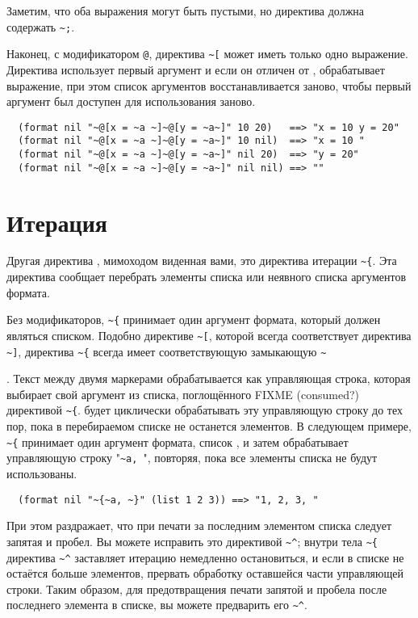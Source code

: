 {Заметим, что оба выражения могут быть пустыми, но директива должна содержать
\lstinline!~;!.

Наконец, с модификатором \lstinline!@!, директива \lstinline!~[! может иметь только одно
выражение. Директива использует первый аргумент и если он отличен от ,
обрабатывает выражение, при этом список аргументов восстанавливается заново, чтобы первый
аргумент был доступен для использования заново.

\begin{verbatim}
  (format nil "~@[x = ~a ~]~@[y = ~a~]" 10 20)   ==> "x = 10 y = 20"
  (format nil "~@[x = ~a ~]~@[y = ~a~]" 10 nil)  ==> "x = 10 "
  (format nil "~@[x = ~a ~]~@[y = ~a~]" nil 20)  ==> "y = 20"
  (format nil "~@[x = ~a ~]~@[y = ~a~]" nil nil) ==> ""
\end{verbatim}

\section{Итерация}

Другая директива , мимоходом виденная вами, это директива итерации
\lstinline!~{!. Эта директива сообщает  перебрать элементы списка или
  неявного списка аргументов формата.

Без модификаторов, \lstinline!~{! принимает один аргумент формата, который должен являться списком. Подобно директиве
\lstinline!~[!, которой всегда соответствует директива \lstinline!~]!, директива \lstinline!~{! всегда имеет соответствующую замыкающую
\lstinline!~!}. Текст между двумя маркерами обрабатывается как управляющая строка, которая выбирает свой аргумент из
списка, поглощённого FIXME (consumed?)  директивой \lstinline!~{!.  будет циклически обрабатывать эту
управляющую строку до тех пор, пока в перебираемом списке не останется элементов. В следующем примере, \lstinline!~{!
принимает один аргумент формата, список , и затем обрабатывает управляющую строку "\lstinline!~a, !", повторяя,
пока все элементы списка не будут использованы.

\begin{verbatim}
  (format nil "~{~a, ~}" (list 1 2 3)) ==> "1, 2, 3, "
\end{verbatim}

При этом раздражает, что при печати за последним элементом списка следует запятая и пробел. Вы можете исправить
это директивой \lstinline!~^!; внутри тела \lstinline!~{! директива \lstinline!~^! заставляет итерацию немедленно остановиться, и если в
списке не остаётся больше элементов, прервать обработку оставшейся части управляющей строки. Таким образом, для
предотвращения печати запятой и пробела после последнего элемента в списке, вы можете предварить его \lstinline!~^!.

